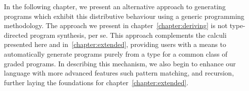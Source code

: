 In the following chapter, we present an alternative approach to generating
programs which exhibit this distributive behaviour using a generic programming
methodology. The approach we present in chapter~\ref{chapter:deriving} is not
type-directed program synthesis, per se. This approach complements the calculi
presented here and in~\ref{chapter:extended}, providing users with a means to
automatically generate programs purely from a type for a common class 
of graded programs. In describing this mechanism, we also begin to
enhance our language with more advanced features such
pattern matching, and recursion, further laying the foundations for
chapter~\ref{chapter:extended}.
